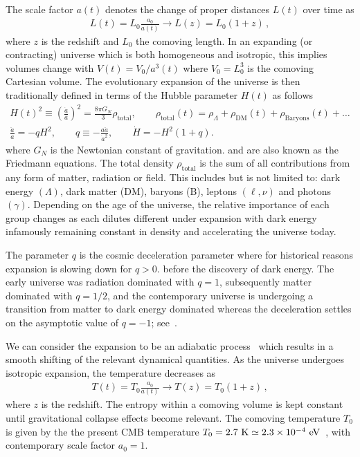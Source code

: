 The scale factor $a(t)$ denotes the change of proper distances $L(t)$ over time as
\begin{gather}
    L(t)=L_{0}\frac{a_{0}}{a(t)}\rightarrow L(z)=L_{0}(1+z)\,,
\end{gather}
where $z$ is the redshift and $L_{0}$ the comoving length. In an expanding (or contracting) universe which is both homogeneous and isotropic, this implies volumes change with $V(t)=V_{0}/a^{3}(t)$ where $V_{0}=L_{0}^{3}$ is the comoving Cartesian volume. The evolutionary expansion of the universe is then traditionally defined in terms of the Hubble parameter $H(t)$ as follows
\begin{gather}
  \label{Friedmann:1} H(t)^{2}\equiv\left(\frac{\dot a}{a}\right)^2=\frac{8\pi G_{N}}{3}\rho_\mathrm{total},\qquad \rho_\mathrm{total}(t)=\rho_{\Lambda}+\rho_\mathrm{DM}(t)+\rho_\mathrm{Baryons}(t)+\ldots\\
  \label{Friedmann:2}
  \frac{\ddot a}{a}=-qH^2,\qquad 
q\equiv -\frac{a\ddot a}{\dot a^2},\qquad \dot H=-H^2(1+q).
\end{gather}
where $G_N$ is the Newtonian constant of gravitation.  and  are also known as the Friedmann equations. The total density $\rho_\mathrm{total}$ is the sum of all contributions from any form of matter, radiation or field. This includes but is not limited to: dark energy $(\Lambda)$, dark matter (DM), baryons (B), leptons $(\ell,\nu)$ and photons $(\gamma)$. Depending on the age of the universe, the relative importance of each group changes as each dilutes different under expansion with dark energy infamously remaining constant in density and accelerating the universe today.

The parameter $q$ is the cosmic deceleration parameter where for historical reasons expansion is slowing down for $q>0$. before the discovery of dark energy. The early universe was radiation dominated with $q = 1$, subsequently matter dominated with $q = 1/2$, and the contemporary universe is undergoing a transition from matter to dark energy dominated whereas the deceleration settles on the asymptotic value of $q = -1$; see~\cite{Rafelski:2013yka}.

We can consider the expansion to be an adiabatic process~\citep{Abdalla:2022yfr} which results in a smooth shifting of the relevant dynamical quantities. As the universe undergoes isotropic expansion, the temperature decreases as 
\begin{gather}
 \label{tscale}
 T(t)=T_{0}\frac{a_{0}}{a(t)}\rightarrow T(z)=T_{0}(1+z)\,,
\end{gather}
where $z$ is the redshift. The entropy within a comoving volume is kept constant until gravitational collapse effects become relevant. The comoving temperature $T_{0}$ is given by the the present CMB temperature $T_{0}=2.7{\rm\ K}\simeq2.3\times10^{-4}\eV$~\citep{Planck:2018vyg}, with contemporary scale factor $a_{0}=1$.

